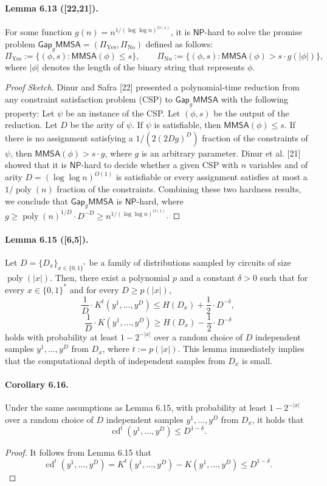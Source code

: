 \documentclass[10pt,a4paper]{article}
\begin{document}
\paragraph{Lemma 6.13 ([22,21]).}
For some function $g(n)=n^{1/(\log\log n)^{O(1)}}$, it is $\mathsf{NP}$-hard to solve the promise problem $\mathsf{Gap}_g\mathsf{MMSA}=(\Pi_{\mathrm{Yes}},\Pi_{\mathrm{No}})$ defined as follows:
\[\Pi_{\mathrm{Yes}}:=\{(\phi,s):\mathsf{MMSA}(\phi)\leq s\},\qquad\Pi_{\mathrm{No}}:=\{(\phi,s):\mathsf{MMSA}(\phi)>s\cdot g(|\phi|)\},\]
where $|\phi|$ denotes the length of the binary string that represents $\phi$.
\begin{proof}[Proof Sketch]
Dinur and Safra [22] presented a polynomial-time reduction from any constraint satisfaction problem (CSP) to $\mathsf{Gap}_g\mathsf{MMSA}$ with the following property: Let $\psi$ be an instance of the CSP. Let $(\phi,s)$ be the output of the reduction. Let $D$ be the arity of $\psi$. If $\psi$ is satisfiable, then $\mathsf{MMSA}(\phi)\leq s$. If there is no assignment satisfying a $1/(2(2Dg)^D)$ fraction of the constraints of $\psi$, then $\mathsf{MMSA}(\phi)>s\cdot g$, where $g$ is an arbitrary parameter. Dinur et al. [21] showed that it is $\mathsf{NP}$-hard to decide whether a given CSP with $n$ variables and of arity $D=(\log\log n)^{O(1)}$ is satisfiable or every assignment satisfies at most a $1/\operatorname{poly}(n)$ fraction of the constraints. Combining these two hardness results, we conclude that $\mathsf{Gap}_g\mathsf{MMSA}$ is $\mathsf{NP}$-hard, where $g\geq\operatorname{poly}(n)^{1/D}\cdot D^{-D}\geq n^{1/(\log\log n)^{O(1)}}$.
\end{proof}
\paragraph{Lemma 6.15 ([6,5]).}
Let $D=\{D_x\}_{x\in\{0,1\}^*}$ be a family of distributions sampled by circuits of size $\operatorname{poly}(|x|)$. Then, there exist a polynomial $p$ and a constant $\delta>0$ such that for every $x\in\{0,1\}^*$ and for every $D\geq p(|x|)$,
\[\frac1D\cdot K^t(y^1,\ldots,y^D)\leq H(D_x)+\frac12\cdot D^{-\delta},\]
\[\frac1D\cdot K(y^1,\ldots,y^D)\geq H(D_x)-\frac12\cdot D^{-\delta}\]
holds with probability at least $1-2^{-|x|}$ over a random choice of $D$ independent samples $y^1,\ldots,y^D$ from $D_x$, where $t:=p(|x|)$.
This lemma immediately implies that the computational depth of independent samples from $D_x$ is small.
\paragraph{Corollary 6.16.}
Under the same assumptions as Lemma 6.15, with probability at least $1-2^{-|x|}$ over a random choice of $D$ independent samples $y^1,\ldots,y^D$ from $D_x$, it holds that
\[\operatorname{cd}^t(y^1,\ldots,y^D)\leq D^{1-\delta}.\]
\begin{proof}
It follows from Lemma 6.15 that
\[\operatorname{cd}^t(y^1,\ldots,y^D)=K^t(y^1,\ldots,y^D)-K(y^1,\ldots,y^D)\leq D^{1-\delta}.\]
\end{proof}
\end{document}
